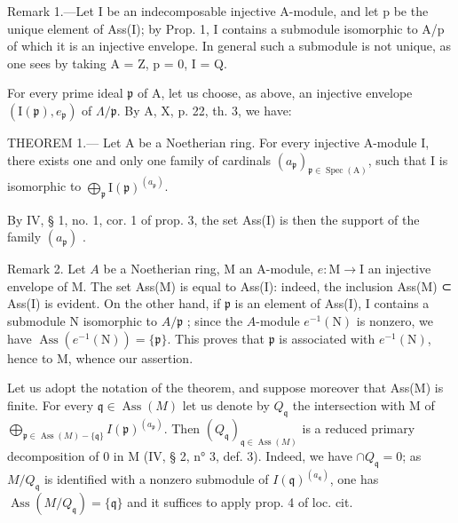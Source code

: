 Remark 1.—Let I be an indecomposable injective A-module, and let p be the unique element of Ass(I); by Prop. 1, I contains a submodule isomorphic to A/p of which it is an injective envelope. In general such a submodule is not unique, as one sees by taking A = Z, p = 0, I = Q.

For every prime ideal \(\mathfrak{p}\) of \(\mathrm{A}\), let us choose, as above, an injective envelope \((\mathrm{I}(\mathfrak{p}), e_{\mathfrak{p}})\) of \(\Lambda/\mathfrak{p}\). By \(\mathrm{A}\), X, p. 22, th. 3, we have:

THEOREM 1.--- Let A be a Noetherian ring. For every injective A-module I, there exists one and only one family of cardinals \((a_{\mathfrak{p}})_{\mathfrak{p}\in\operatorname{Spec}(\mathrm{A})}\), such that I is isomorphic to \(\bigoplus_{\mathfrak{p}}\mathrm{I}(\mathfrak{p})^{(a_{\mathfrak{p}})}\).

By IV, § 1, no. 1, cor. 1 of prop. 3, the set Ass(I) is then the support of the family \((a_{\mathfrak{p}})\) .

Remark 2. Let \(A\) be a Noetherian ring, M an A-module, \(e: \mathrm{M} \to \mathrm{I}\) an injective envelope of M. The set Ass(M) is equal to Ass(I): indeed, the inclusion Ass(M) ⊂ Ass(I) is evident. On the other hand, if \(\mathfrak{p}\) is an element of Ass(I), I contains a submodule N isomorphic to \(A/\mathfrak{p}\) ; since the \(A\)-module \(e^{-1}(\mathrm{N})\) is nonzero, we have \(\operatorname{Ass}(e^{-1}(\mathrm{N})) = \{\mathfrak{p}\}\). This proves that \(\mathfrak{p}\) is associated with \(e^{-1}(\mathrm{N})\), hence to M, whence our assertion.

Let us adopt the notation of the theorem, and suppose moreover that Ass(M) is finite. For every \(\mathfrak{q} \in \operatorname{Ass}(M)\) let us denote by \(Q_{\mathfrak{q}}\) the intersection with M of \(\bigoplus_{\mathfrak{p} \in \operatorname{Ass}(M) - \{\mathfrak{q}\}} I(\mathfrak{p})^{(a_{\mathfrak{p}})}\). Then \((Q_{\mathfrak{q}})_{\mathfrak{q} \in \operatorname{Ass}(M)}\) is a reduced primary decomposition of 0 in M (IV, § 2, n° 3, def. 3). Indeed, we have \(\cap Q_{\mathfrak{q}} = 0\); as \(M/Q_{\mathfrak{q}}\) is identified with a nonzero submodule of \(I(\mathfrak{q})^{(a_{\mathfrak{q}})}\), one has \(\operatorname{Ass}(M/Q_{\mathfrak{q}}) = \{\mathfrak{q}\}\) and it suffices to apply prop. 4 of loc. cit.


